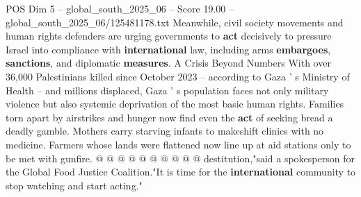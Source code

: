 \begin{textsample}{POS Dim 5 – global\_south\_2025\_06 – Score 19.00 – global\_south\_2025\_06/125481178.txt}
Meanwhile, civil society movements and human rights defenders are urging governments to \textbf{act} decisively to pressure Israel into compliance with \textbf{international} law, including arms \textbf{embargoes}, \textbf{sanctions}, and diplomatic \textbf{measures}.
A Crisis Beyond Numbers With over 36,000 Palestinians killed since October 2023 -- according to Gaza ' s Ministry of Health -- and millions displaced, Gaza ' s population faces not only military violence but also systemic deprivation of the most basic human rights.
Families torn apart by airstrikes and hunger now find even the \textbf{act} of seeking bread a deadly gamble.
Mothers carry starving infants to makeshift clinics with no medicine.
Farmers whose lands were flattened now line up at aid stations only to be met with gunfire. @ @ @ @ @ @ @ @ @ @ destitution,"said a spokesperson for the Global Food Justice Coalition."It is time for the \textbf{international} community to stop watching and start acting."

\end{textsample}
